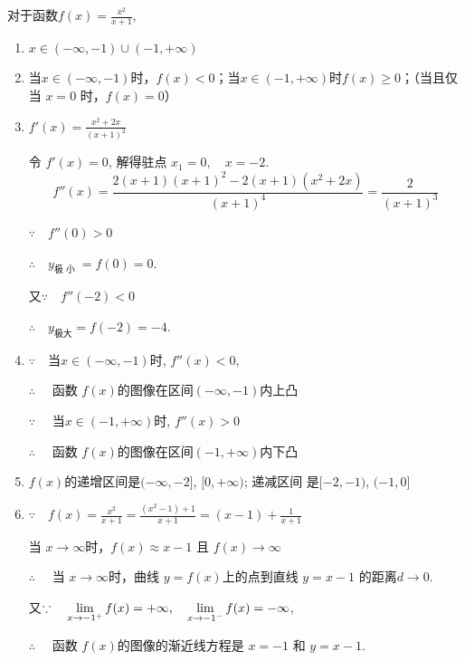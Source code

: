 \begin{solution}
    对于函数$f(x)=\frac{x^2}{x+1}$,
\begin{enumerate}[(1)]
    \item $x\in ( - \infty , - 1) \cup ( - 1, + \infty )$ 
    \item 当$x\in(-\infty,-1)$时，$f(x)<0$；当$x\in(-1,+\infty)$时$f(x)\geqslant0$；（当且仅当 $x=0$ 时，$f(x)=0$）
    \item $f'(x)=\frac{x^2+2x}{(x+1)^2}$

令 $f'\left(x\right)=0$, 解得驻点 $x_1=0,\quad x=-2$.
$$f''(x)=\frac{2(x+1)(x+1)^2-2(x+1)(x^2+2x)}{(x+1)^4}=\frac{2}{(x+1)^{3}}$$

$\because\quad f''( 0) > 0$

$\therefore\quad y_{\text{极 小 }}= f( 0) = 0$.

又$\because\quad f'' (-2)<0$

$\therefore\quad  y_{\text{极大}}=f(-2)=-4$.

\item $\because\quad$当$x\in ( - \infty , - 1)$时, $f''( x) < 0$,

$\therefore\quad $ 函数 $f(x)$的图像在区间$(-\infty,-1)$内上凸

$\because\quad $ 当$x\in(-1,+\infty)$时, $f''(x)>0$

$\therefore\quad$ 函数 $f(x)$的图像在区间$(-1,+\infty)$内下凸

\item $f(x)$的递增区间是$(-\infty,-2]$, $[0,+\infty)$; 递减区间
是$[-2,-1)$, $(-1,0]$

\item $\because\quad f( x) = \frac {x^{2}}{x+ 1}= \frac {( x^{2}- 1) + 1}{x+ 1}=(x-1)+\frac{1}{x+1}$

当 $x\to\infty$时，$f(x)\approx x-1$ 且 $f(x)\to\infty$

$\therefore\quad $ 当  $x\to \infty$时，曲线 $y=f(x)$上的点到直线 $y=x-1$
的距离$d\to0$.

又$\because\quad \lim\limits_{x\to - 1^{+}}f( x) = + \infty,\quad \lim\limits_{x\to - 1^{- }}f( x) = - \infty$,

$\therefore\quad $ 函数 $f(x)$的图像的渐近线方程是 $x=-1$ 和
$y=x-1$.


\end{enumerate}
\end{solution}
